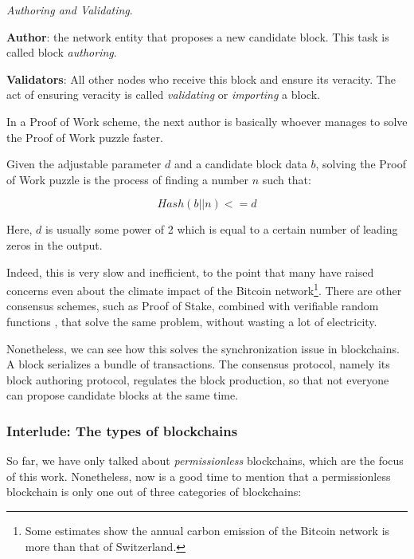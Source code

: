 \begin{definition} \label{def:auhtor_validator}

	\textit{Authoring and Validating}.

	\textbf{Author}: the network entity that proposes a new candidate block. This task is called
	block \textit{authoring}.

	\textbf{Validators}: All other nodes who receive this block and ensure its veracity. The act of
	ensuring veracity is called \textit{validating} or \textit{importing} a block.
\end{definition}

In a Proof of Work scheme, the next author is basically whoever manages to solve the Proof of Work
puzzle faster.

\begin{definition} \label{def:pow} Given the adjustable parameter $d$ and a candidate block data
$b$, solving the Proof of Work puzzle is the process of finding a number $n$ such that:

	\begin{equation}
		Hash(b || n) <= d
	\end{equation}

Here, $d$ is usually some power of 2 which is equal to a certain number of leading zeros in the
output.
\end{definition}

Indeed, this is very slow and inefficient, to the point that many have raised concerns even about
the climate impact of the Bitcoin network\footnote{Some estimates show the annual carbon emission of
the Bitcoin network is more than that of Switzerland\cite{stollCarbonFootprintBitcoin2019}.}. There
are other consensus schemes, such as Proof of Stake, combined with verifiable random
functions \cite{dodisVerifiableRandomFunction2005}, that solve the same problem, without wasting a
lot of electricity.

Nonetheless, we can see how this solves the synchronization issue in blockchains. A block serializes
a bundle of transactions. The consensus protocol, namely its block authoring protocol, regulates the
block production, so that not everyone can propose candidate blocks at the same time.

\subsubsection{Interlude: The types of blockchains}

So far, we have only talked about \textit{permissionless} blockchains, which are the focus of this
work. Nonetheless, now is a good time to mention that a permissionless blockchain is only one out of
three categories of blockchains:


